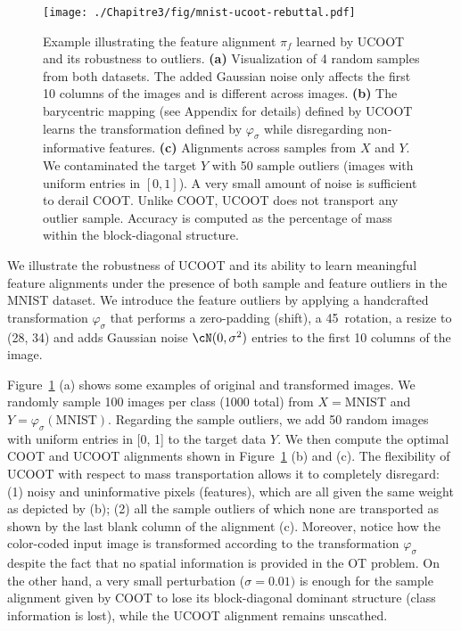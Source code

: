 \begin{figure}[t]
  \centering
  \texttt{[image: ./Chapitre3/fig/mnist-ucoot-rebuttal.pdf]}
  \caption{Example illustrating the feature alignment $\pi_f$ learned by UCOOT
  and its robustness to outliers.
  \textbf{(a)} Visualization of 4 random samples from both datasets.
  The added Gaussian noise only affects the first 10 columns of the images
  and is different across images.
  \textbf{(b)} The barycentric mapping (see Appendix for details)
  defined by UCOOT learns the transformation defined by $\varphi_\sigma$
  while disregarding non-informative features.
  \textbf{(c)} Alignments across samples from $X$ and $Y$.
  We contaminated the target $Y$ with 50 sample outliers
  (images with uniform entries in $[0,1]$).
  A very small amount of noise is sufficient to derail COOT.
  Unlike COOT, UCOOT does not transport any outlier sample.
  Accuracy is computed as the percentage of mass within the block-diagonal structure.
  \label{f:mnist-example}}
\end{figure}
We illustrate the robustness of UCOOT and its ability to learn meaningful feature alignments
under the presence of both sample and feature outliers in the MNIST dataset.
We introduce the feature outliers by applying a handcrafted transformation $\varphi_\sigma$
that performs a zero-padding (shift), a 45\textdegree\ rotation,
a resize to (28, 34) and adds Gaussian noise $\cN(0, \sigma^2)$ entries
to the first 10 columns of the image.

Figure~\ref{f:mnist-example} (a) shows some examples of original and transformed images.
We randomly sample 100 images per class (1000 total) from $X = \text{MNIST}$ and
$Y = \varphi_{\sigma}(\text{MNIST})$. Regarding the sample outliers,
we add 50 random images with uniform entries in [0, 1] to the target data $Y$.
We then compute the optimal COOT and UCOOT alignments shown in
Figure~\ref{f:mnist-example} (b) and (c).
The flexibility of UCOOT with respect to mass transportation allows it to completely disregard:
(1) noisy and uninformative pixels (features),
which are all given the same weight as depicted by (b);
(2) all the sample outliers of which none are transported as shown
by the last blank column of the alignment (c).
Moreover, notice how the color-coded input image is transformed according to
the transformation $\varphi_{\sigma}$ despite the fact that
no spatial information is provided in the OT problem. On the other hand,
a very small perturbation ($\sigma = 0.01)$ is enough for the sample alignment
given by COOT to lose its block-diagonal dominant structure (class information is lost),
while the UCOOT alignment remains unscathed.

